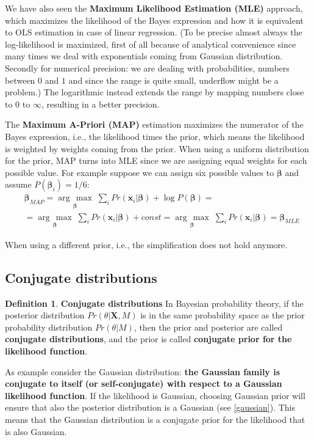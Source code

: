 \documentclass[12pt, letterpaper]{article}
\theoremstyle{definition}
\newtheorem{definition}{Definition}[section]
\newcommand{\X}{\mathrm{\mathbf{X}}}
\newcommand{\be}{\mathbf{\beta}}
\newcommand{\x}{\mathbf{x}}
\newcommand{\argmax}[1]{\underset{#1}{\operatorname{arg}\,\operatorname{max}}\;}
\begin{document}
We have also seen the \textbf{Maximum Likelihood Estimation (MLE)} approach, which maximizes the likelihood of the Bayes expression and how it is equivalent to OLS estimation in case of linear regression. (To be precise almost always the log-likelihood is maximized, first of all because of analytical convenience since many times we deal with exponentials coming from Gaussian distribution. Secondly for numerical precision: we are dealing with probabilities, numbers between $0$ and $1$ and since the range is quite small, underflow might be a problem.) The logarithmic instead extends the range by mapping numbers close to $0$ to $\infty$, resulting in a better precision.

The \textbf{Maximum A-Priori (MAP)} estimation maximizes the numerator of the Bayes expression, i.e., the likelihood times the prior, which means the likelihood is weighted by weights coming from the prior. When using a uniform distribution for the prior, MAP turns into MLE since we are assigning equal weights for each possible value. For example suppose we can assign six possible values to $\be$ and assume $P(\be_i)=1/6$:
\begin{equation}
\begin{aligned}
&\be_{MAP} = \argmax{\be}{\sum_i Pr(\x_i|\be) + \log P(\be)} =
\\&= \argmax{\be}{\sum_i Pr(\x_i|\be) +const}=\argmax{\be}{\sum_i Pr(\x_i|\be)} = \be_{MLE}
\end{aligned}
\end{equation}

When using a different prior, i.e., the simplification does not hold anymore.

\subsection{Conjugate distributions}
\label{conjugacy}
\begin{definition}{\textbf{Conjugate distributions}}
In Bayesian probability theory, if the posterior distribution $Pr(\theta|\X,M)$ is in the same probability space as the prior probability distribution $Pr(\theta|M)$, then the prior and posterior are called \textbf{conjugate distributions}, and the prior is called \textbf{conjugate prior for the likelihood function}. 
\end{definition}

As example consider the Gaussian distribution: \textbf{the Gaussian family is conjugate to itself (or self-conjugate) with respect to a Gaussian likelihood function}. If the likelihood is Gaussian, choosing Gaussian prior will ensure that also the posterior distribution is a Gaussian (see \autoref{gaussian}). This means that the Gaussian distribution is a conjugate prior for the likelihood that is also Gaussian.
\end{document}
